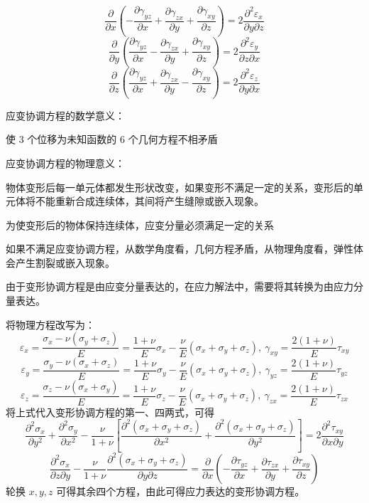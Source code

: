 \documentclass[12pt,a4paper]{article}
\begin{document}
$$
\frac{\partial}{\partial x}(-\frac{\partial\gamma_{yz}}{\partial x}+\frac{\partial\gamma_{zx}}{\partial y}+\frac{\partial\gamma_{xy}}{\partial z})=2\frac{\partial ^2 \varepsilon_x}{\partial y\partial z}
$$
$$
\frac{\partial}{\partial y}(\frac{\partial\gamma_{yz}}{\partial x}-\frac{\partial\gamma_{zx}}{\partial y}+\frac{\partial\gamma_{xy}}{\partial z})=2\frac{\partial ^2 \varepsilon_y}{\partial z\partial x}
$$
$$
\frac{\partial}{\partial z}(\frac{\partial\gamma_{yz}}{\partial x}+\frac{\partial\gamma_{zx}}{\partial y}-\frac{\partial\gamma_{xy}}{\partial z})=2\frac{\partial ^2 \varepsilon_z}{\partial y\partial x}
$$

应变协调方程的数学意义：

使 $3$ 个位移为未知函数的 $6$ 个几何方程不相矛盾

应变协调方程的物理意义：

物体变形后每一单元体都发生形状改变，如果变形不满足一定的关系，变形后的单元体将不能重新合成连续体，其间将产生缝隙或嵌入现象。

为使变形后的物体保持连续体，应变分量必须满足一定的关系

如果不满足应变协调方程，从数学角度看，几何方程矛盾，从物理角度看，弹性体会产生割裂或嵌入现象。

由于变形协调方程是由应变分量表达的，在应力解法中，需要将其转换为由应力分量表达。

将物理方程改写为：
$$
\varepsilon_x=\frac{\sigma_x-\nu(\sigma_y+\sigma_z)}{E}=\frac{1+\nu}{E}\sigma_x-\frac{\nu}{E}(\sigma_x+\sigma_y+\sigma_z),~\gamma_{xy}=\frac{2(1+\nu)}{E}\tau_{xy}
$$
$$
\varepsilon_y=\frac{\sigma_y-\nu(\sigma_x+\sigma_z)}{E}=\frac{1+\nu}{E}\sigma_y-\frac{\nu}{E}(\sigma_x+\sigma_y+\sigma_z),~\gamma_{yz}=\frac{2(1+\nu)}{E}\tau_{yz}
$$
$$
\varepsilon_z=\frac{\sigma_z-\nu(\sigma_x+\sigma_y)}{E}=\frac{1+\nu}{E}\sigma_z-\frac{\nu}{E}(\sigma_x+\sigma_y+\sigma_z),~\gamma_{zx}=\frac{2(1+\nu)}{E}\tau_{zx}
$$
将上式代入变形协调方程的第一、四两式，可得
$$
\frac{\partial^2 \sigma_x}{\partial y^2}+\frac{\partial^2 \sigma_y}{\partial x^2}-\frac{\nu}{1+\nu}\left[\frac{\partial^2 (\sigma_x+\sigma_y+\sigma_z)}{\partial x^2}+\frac{\partial^2 (\sigma_x+\sigma_y+\sigma_z)}{\partial y^2}\right]=2\frac{\partial^2 \tau_{xy}}{\partial x\partial y}
$$
$$
\frac{\partial^2 \sigma_x}{\partial z\partial y}-\frac{\nu}{1+\nu}\frac{\partial^2 (\sigma_x+\sigma_y+\sigma_z)}{\partial y\partial z}=\frac{\partial}{\partial x}(-\frac{\partial\tau_{yz}}{\partial x}+\frac{\partial\tau_{zx}}{\partial y}+\frac{\partial\tau_{xy}}{\partial z})
$$
轮换 $x,y,z$ 可得其余四个方程，由此可得应力表达的变形协调方程。
\end{document}
